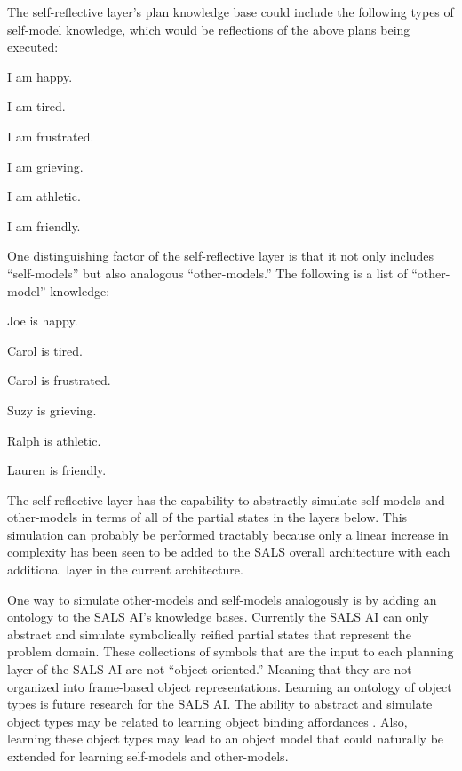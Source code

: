 \noindent The self-reflective layer's plan knowledge base could include the
following types of self-model knowledge, which would be reflections of
the above plans being executed:

\begin{packed_itemize}
\item{I am happy.}
\item{I am tired.}
\item{I am frustrated.}
\item{I am grieving.}
\item{I am athletic.}
\item{I am friendly.}
\end{packed_itemize}

\noindent One distinguishing factor of the self-reflective layer is
that it not only includes ``self-models'' but also analogous
``other-models.''  The following is a list of ``other-model''
knowledge:

\begin{packed_itemize}
\item{Joe is happy.}
\item{Carol is tired.}
\item{Carol is frustrated.}
\item{Suzy is grieving.}
\item{Ralph is athletic.}
\item{Lauren is friendly.}
\end{packed_itemize}

\noindent The self-reflective layer has the capability to abstractly
simulate self-models and other-models in terms of all of the partial
states in the layers below.  This simulation can probably be performed
tractably because only a linear increase in complexity has been seen
to be added to the SALS overall architecture with each additional
layer in the current architecture.

One way to simulate other-models and self-models analogously is by
adding an ontology to the SALS AI's knowledge bases.  Currently the
SALS AI can only abstract and simulate symbolically reified partial
states that represent the problem domain.  These collections of
symbols that are the input to each planning layer of the SALS AI are
not ``object-oriented.''  Meaning that they are not organized into
frame-based object representations.  Learning an ontology of object
types is future research for the SALS AI.  The ability to abstract and
simulate object types may be related to learning object binding
affordances \cite[]{stoytchev:2005}.  Also, learning these object
types may lead to an object model that could naturally be extended for
learning self-models and other-models.

